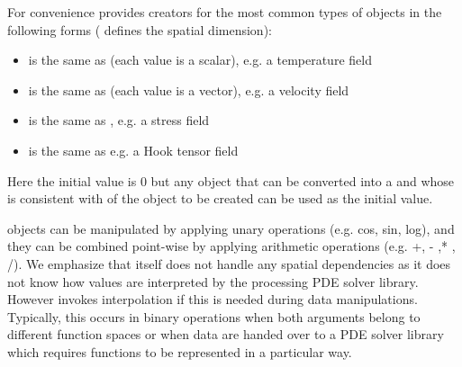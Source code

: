 For convenience \escript provides creators for the most common types
of \Data objects in the following forms ( defines the spatial dimension):
\begin{itemize}
\item {} is the same as 
    (each value is a scalar), e.g. a temperature field
\item {} is the same as 
    (each value is a vector), e.g. a velocity field
\item {} is the same as ,
    e.g. a stress field
\item {} is the same as 
    e.g. a Hook tensor field
\end{itemize}
Here the initial value is 0 but any object that can be converted into
a \numpyNDA and whose \Shape is consistent with \Shape of the \Data object to
be created can be used as the initial value.

\Data objects can be manipulated by applying unary operations (e.g. cos, sin,
log), and they can be combined point-wise by applying arithmetic operations
(e.g. +, - ,* , /).
We emphasize that \escript itself does not handle any spatial dependencies as
it does not know how values are interpreted by the processing PDE solver library.
However \escript invokes interpolation if this is needed during data manipulations.
Typically, this occurs in binary operations when both arguments belong to
different function spaces or when data are handed over to a PDE solver library
which requires functions to be represented in a particular way.

